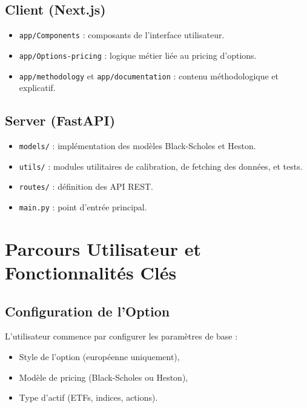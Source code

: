 \subsection*{Client (Next.js)}

\begin{itemize} \item \texttt{app/Components} : composants de l'interface utilisateur. \item \texttt{app/Options-pricing} : logique métier liée au pricing d'options. \item \texttt{app/methodology} et \texttt{app/documentation} : contenu méthodologique et explicatif. \end{itemize}

\subsection*{Server (FastAPI)}

\begin{itemize} \item \texttt{models/} : implémentation des modèles Black-Scholes et Heston. \item \texttt{utils/} : modules utilitaires de calibration, de fetching des données, et tests. \item \texttt{routes/} : définition des API REST. \item \texttt{main.py} : point d'entrée principal. \end{itemize}

\section{Parcours Utilisateur et Fonctionnalités Clés}

\subsection{Configuration de l'Option}

L'utilisateur commence par configurer les paramètres de base :

\begin{itemize} \item Style de l'option (européenne uniquement), \item Modèle de pricing (Black-Scholes ou Heston), \item Type d'actif (ETFs, indices, actions). \end{itemize}

